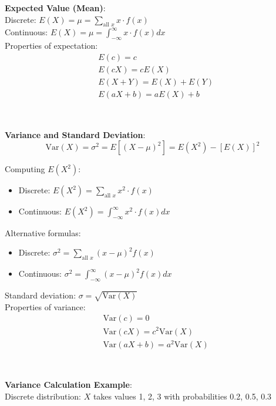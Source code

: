 \documentclass{article}
\newenvironment{cheatformula}[1][Title]{
    \begin{minipage}{\linewidth}
    \textbf{#1}:\\
}{
    \end{minipage}\\[2ex]
}
\begin{document}
\begin{multicols*}{2}
\begin{cheatformula}[Expected Value (Mean)]
    Discrete: $E(X) = \mu = \sum_{\text{all } x} x \cdot f(x)$\\
    Continuous: $E(X) = \mu = \int_{-\infty}^{\infty} x \cdot f(x)dx$\\
    
    Properties of expectation:
    \begin{align*}
        &E(c) = c\\
        &E(cX) = cE(X)\\
        &E(X + Y) = E(X) + E(Y)\\
        &E(aX + b) = aE(X) + b
    \end{align*}
\end{cheatformula}

\begin{cheatformula}[Variance and Standard Deviation]
    $$\text{Var}(X) = \sigma^2 = E[(X-\mu)^2] = E(X^2) - [E(X)]^2$$
    
    Computing $E(X^2)$:
    \begin{itemize}
        \item Discrete: $E(X^2) = \sum_{\text{all } x} x^2 \cdot f(x)$
        \item Continuous: $E(X^2) = \int_{-\infty}^{\infty} x^2 \cdot f(x)dx$
    \end{itemize}
    
    Alternative formulas:
    \begin{itemize}
        \item Discrete: $\sigma^2 = \sum_{\text{all } x} (x-\mu)^2 f(x)$
        \item Continuous: $\sigma^2 = \int_{-\infty}^{\infty} (x-\mu)^2 f(x)dx$
    \end{itemize}
    
    Standard deviation: $\sigma = \sqrt{\text{Var}(X)}$\\
    
    Properties of variance:
    \begin{align*}
        &\text{Var}(c) = 0\\
        &\text{Var}(cX) = c^2\text{Var}(X)\\
        &\text{Var}(aX + b) = a^2\text{Var}(X)
    \end{align*}
\end{cheatformula}

\begin{cheatformula}[Variance Calculation Example]
    Discrete distribution: $X$ takes values 1, 2, 3 with probabilities 0.2, 0.5, 0.3\\
    

\end{cheatformula}
\end{multicols*}
\end{document}

